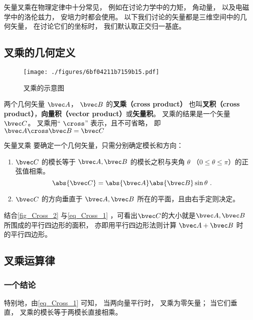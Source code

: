 

矢量叉乘在物理定律中十分常见， 例如在讨论力学中的力矩， 角动量， 以及电磁学中的洛伦兹力， 安培力时都会使用。 以下我们讨论的矢量都是三维空间中的几何矢量， 在讨论它们的坐标时， 我们默认取正交归一基底。

\subsection{叉乘的几何定义}

\begin{figure}[ht]
\centering
\texttt{[image: ./figures/6bf04211b7159b15.pdf]}
\caption{叉乘的示意图} \label{fig_Cross_2}
\end{figure}

两个几何矢量 $\bvec A$，  $\bvec B$ 的\textbf{叉乘（cross product）} 也叫\textbf{叉积（cross product）}，\textbf{向量积（vector product）}或\textbf{矢量积}。 叉乘的结果是一个矢量 $\bvec C$。  叉乘用“ $\cross$” 表示，且不可省略， 即 $ \bvec A \cross \bvec B = \bvec C$

\begin{definition}{矢量叉乘}\label{def_Cross_1}
要确定一个几何矢量，只需分别确定模长和方向：
\begin{enumerate}
\item $\bvec C$ 的模长等于 $\bvec A, \bvec B$ 的模长之积与夹角 $\theta$ （$0 \leqslant \theta \leqslant \pi$）的正弦值相乘。
\begin{equation}\label{eq_Cross_1}
\abs{\bvec C}  = \abs{\bvec A} \abs{\bvec B} \sin\theta ~.
\end{equation}
\item $\bvec C$ 的方向垂直于 $\bvec A, \bvec B$ 所在的平面，且由右手定则决定。
\end{enumerate}
\end{definition}

结合\autoref{fig_Cross_2} 与\autoref{eq_Cross_1} ，可看出$\bvec C$的大小就是$\bvec A, \bvec B$所围成的平行四边形的面积， 亦即用平行四边形法则计算 $\bvec A + \bvec B$ 时的平行四边形。

\subsection{叉乘运算律}
\subsubsection{一个结论}
特别地，由\autoref{eq_Cross_1} 可知， 当两向量平行时， 叉乘为零矢量； 当它们垂直， 叉乘的模长等于两模长直接相乘。%

